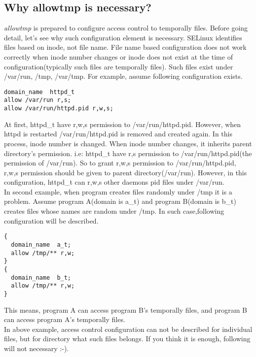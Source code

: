 \documentclass{article}
\begin{document}
\subsection{Why allowtmp is necessary?}
{\it allowtmp} is prepared to configure access control to temporally
files.
Before going detail, let's see why such configuration element is necessary.
SELinux identifies files based on inode, not file name. File name based
configuration does not work correctly when inode number changes or inode
does not exist at the time of configuration(typically such files are
temporally files).
Such files exist under  /var/run, /tmp, /var/tmp.
For example, assume following configuration exists.\\
\begin{verbatim}
domain_name  httpd_t
allow /var/run r,s;
allow /var/run/httpd.pid r,w,s;
\end{verbatim}
At first, httpd\_t have r,w,s permission to /var/run/httpd.pid.
However, when httpd is restarted /var/run/httpd.pid is removed and
created again. In this process, inode number is changed. When inode
number changes, it inherits parent directory's permission. i.e:
 httpd\_t have r,s permission to /var/run/httpd.pid(the permission of
 /var/run). So to grant r,w,s permission to /var/run/httpd.pid, r,w,s
 permission should be given to parent directory(/var/run).
However, in this configuration, httpd\_t can r,w,s other daemons pid
files under /var/run. 
\\
In second example, when program creates files randomly under /tmp it is
a problem. Assume program  A(domain is a\_t) and program B(domain is
b\_t) creates files whose names are random under /tmp. In such
case,following configuration will be described.
\begin{verbatim}
{
  domain_name  a_t;
  allow /tmp/** r,w;
}
{
  domain_name  b_t;
  allow /tmp/** r,w;
}
\end{verbatim}
This means, program A can access program B's temporally files, and
program B can access program A's temporally files. \\
In above example, access control configuration can not be described for
individual files, but for directory what such files belongs.
If you think it is enough, following will not necessary :-).\\
\end{document}
